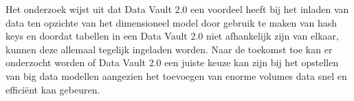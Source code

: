 \documentclass[a0,portrait]{a0poster}
\begin{document}
\begin{multicols}{2}
Het onderzoek wijst uit dat Data Vault 2.0 een voordeel heeft bij het inladen van data ten opzichte van het dimensioneel model door gebruik te maken van hash keys en doordat tabellen in een Data Vault 2.0 niet afhankelijk zijn van elkaar, kunnen deze allemaal tegelijk ingeladen worden. Naar de toekomst toe kan er onderzocht worden of Data Vault 2.0 een juiste keuze kan zijn bij het opstellen van big data modellen aangezien het toevoegen van enorme volumes data snel en efficiënt kan gebeuren.



\end{multicols}
\end{document}
